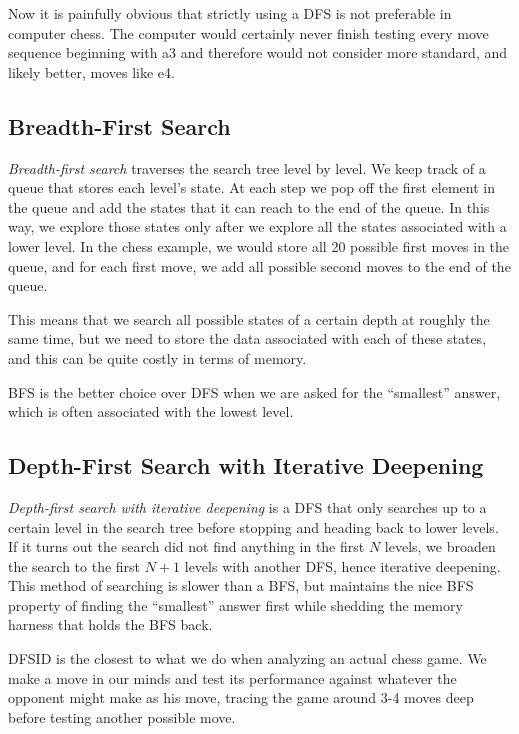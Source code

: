 Now it is painfully obvious that strictly using a DFS is not preferable in computer chess. The computer would certainly never finish testing every move sequence beginning with a3 and therefore would not consider more standard, and likely better, moves like e4.

\subsection{Breadth-First Search}

\textit{Breadth-first search} traverses the search tree level by level. We keep track of a queue that stores each level's state. At each step we pop off the first element in the queue and add the states that it can reach to the end of the queue. In this way, we explore those states only after we explore all the states associated with a lower level. In the chess example, we would store all 20 possible first moves in the queue, and for each first move, we add all possible second moves to the end of the queue.

This means that we search all possible states of a certain depth at roughly the same time, but we need to store the data associated with each of these states, and this can be quite costly in terms of memory.

BFS is the better choice over DFS when we are asked for the ``smallest'' answer, which is often associated with the lowest level.

\subsection{Depth-First Search with Iterative Deepening}

\textit{Depth-first search with iterative deepening} is a DFS that only searches up to a certain level in the search tree before stopping and heading back to lower levels. If it turns out the search did not find anything in the first $N$ levels, we broaden the search to the first $N+1$ levels with another DFS, hence iterative deepening. This method of searching is slower than a BFS, but maintains the nice BFS property of finding the ``smallest'' answer first while shedding the memory harness that holds the BFS back.

DFSID is the closest to what we do when analyzing an actual chess game. We make a move in our minds and test its performance against whatever the opponent might make as his move, tracing the game around 3-4 moves deep before testing another possible move.

